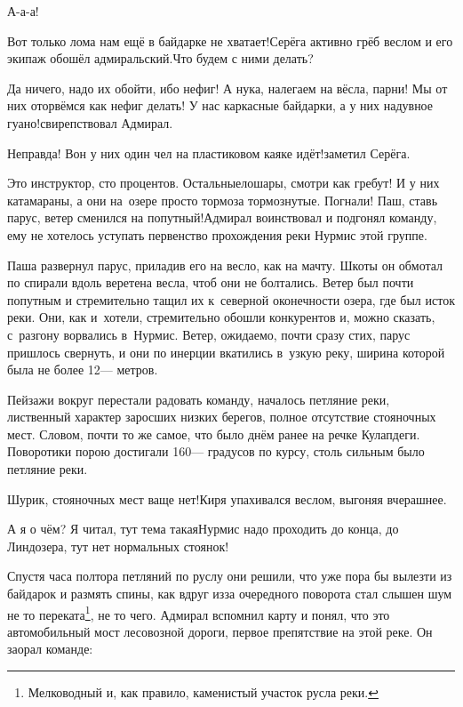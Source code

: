 \diagdash А-а-а!

\diagdash Вот только лома нам ещё в байдарке не хватает!\mdash Серёга активно грёб веслом и его экипаж обошёл адмиральский.\mdash Что будем с ними делать?

\diagdash Да ничего, надо их обойти, ибо нефиг! А ну\sdash ка, налегаем на вёсла, парни! Мы от них оторвёмся как нефиг делать! У нас каркасные байдарки, а у них надувное гуано!\mdash свирепствовал Адмирал.

\diagdash Неправда! Вон у них один чел на пластиковом каяке идёт!\mdash заметил Серёга.

\diagdash Это инструктор, сто процентов. Остальные\mdash лошары, смотри как гребут! И у них катамараны, а они на~озере просто тормоза тормознутые. Погнали! Паш, ставь парус, ветер сменился на попутный!\mdash Адмирал воинствовал и подгонял команду, ему не хотелось уступать первенство прохождения реки Нурмис этой группе.

Паша развернул парус, приладив его на весло, как на мачту. Шкоты он обмотал по спирали вдоль веретена весла, чтоб они не болтались. Ветер был почти попутным и стремительно тащил их к~северной оконечности озера, где был исток реки. Они, как и~хотели, стремительно обошли конкурентов и, можно сказать, с~разгону ворвались в~Нурмис. Ветер, ожидаемо, почти сразу стих, парус пришлось свернуть, и они по инерции вкатились в~узкую реку, ширина которой была не более 12\thinspace\nobreakdash--- метров.

Пейзажи вокруг перестали радовать команду, началось петляние реки, лиственный характер заросших низких берегов, полное отсутствие стояночных мест. Словом, почти то же самое, что было днём ранее на речке Кулапдеги. Поворотики порою достигали 160\thinspace\nobreakdash--- градусов по курсу, столь сильным было петляние реки.

\diagdash Шурик, стояночных мест ваще нет!\mdash Киря упахивался веслом, выгоняя вчерашнее.

\diagdash А я о чём? Я читал, тут тема такая\mdash Нурмис надо проходить до конца, до Линдозера, тут нет нормальных стоянок!

\renewcommand*{\thefootnote}{\fnsymbol{footnote}}
\setcounter{footnote}{0}
Спустя часа полтора петляний по руслу они решили, что уже пора бы вылезти из байдарок и размять спины, как вдруг из\sdash за очередного поворота стал слышен шум не то переката\footnote{Мелководный и, как правило, каменистый участок русла реки.}, не то чего. Адмирал вспомнил карту и понял, что это автомобильный мост лесовозной дороги, первое препятствие на этой реке. Он заорал команде:

